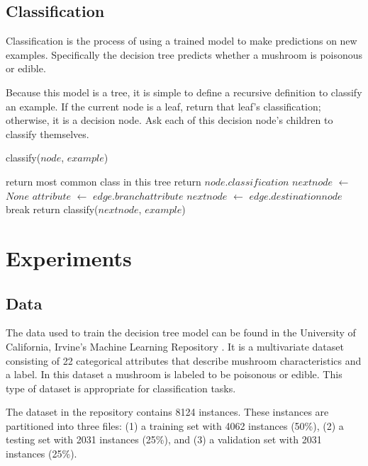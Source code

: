 \documentclass{IEEEtran}
\begin{document}
\subsection{Classification}
Classification is the process of using a trained model to make
predictions on new examples. Specifically the decision tree predicts
whether a mushroom is poisonous or edible.

Because this model is a tree, it is simple to define a recursive
definition to classify an example. If the current node is a leaf,
return that leaf's classification; otherwise, it is a decision
node. Ask each of this decision node's children to classify themselves.


\begin{algorithm}
\caption{classify($node$, $example$)}
\begin{algorithmic}
\Statex {}
  \State return most common class in this tree
\EndIf
{}
  \State return $node.classification$
\EndIf
\State $nextnode$ $\leftarrow$ $None$
  \State $attribute$ $\leftarrow$ $edge.branchattribute$
    \State $nextnode$ $\leftarrow$ $edge.destinationnode$
    \State break
  \EndIf
\EndFor
\State return classify($nextnode$, $example$)
\end{algorithmic}
\end{algorithm}

\section{Experiments}
\subsection{Data}
The data used to train the decision tree model can be found in the
University of California, Irvine's Machine Learning
Repository \parencite{schlimmer1981mushroom}. It is a multivariate dataset
consisting of 22 categorical attributes that describe mushroom
characteristics and a label. In this dataset a mushroom is labeled to
be poisonous or edible. This type of dataset is appropriate for
classification tasks.

The dataset in the repository contains 8124 instances. These instances
are partitioned into three files: (1) a training set with 4062 instances
(50\%), (2) a testing set with 2031 instances (25\%), and (3) a
validation set with 2031 instances (25\%).
\end{document}
